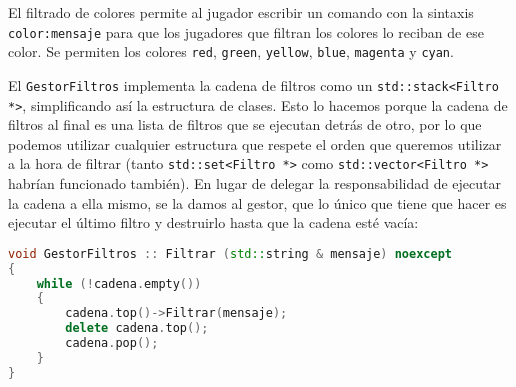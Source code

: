 El filtrado de colores permite al jugador escribir un comando con la sintaxis \texttt{color:mensaje} para que los jugadores que filtran los colores lo reciban de ese color.
Se permiten los colores \texttt{red}, \texttt{green}, \texttt{yellow}, \texttt{blue}, \texttt{magenta} y \texttt{cyan}.

El \texttt{GestorFiltros} implementa la cadena de filtros como un \texttt{std::stack<Filtro *>}, simplificando así la estructura de clases.
Esto lo hacemos porque la cadena de filtros al final es una lista de filtros que se ejecutan detrás de otro, por lo que podemos utilizar cualquier estructura que respete el orden que queremos utilizar a la hora de filtrar (tanto \texttt{std::set<Filtro *>} como \texttt{std::vector<Filtro *>} habrían funcionado también).
En lugar de delegar la responsabilidad de ejecutar la cadena a ella mismo, se la damos al gestor, que lo único que tiene que hacer es ejecutar el último filtro y destruirlo hasta que la cadena esté vacía:

\begin{lstlisting}[language=C++]
void GestorFiltros :: Filtrar (std::string & mensaje) noexcept
{
	while (!cadena.empty())
	{
		cadena.top()->Filtrar(mensaje);
		delete cadena.top();
		cadena.pop();
	}
}
\end{lstlisting}
